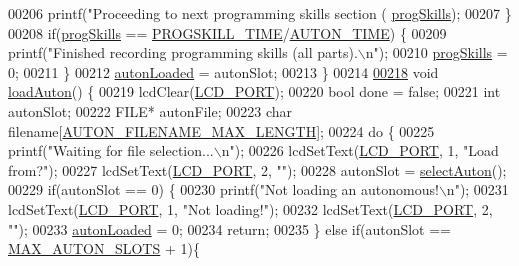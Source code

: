 \begin{DoxyCode}
{{{{{{{{{{{{{{{{{{{{{{{00206         printf(\textcolor{stringliteral}{"Proceeding to next programming skills section (%
      \hyperlink{autonrecorder_8c_aa2eda471576bdbaf33835a71da9bc616}{progSkills});
00207     \}
00208     \textcolor{keywordflow}{if}(\hyperlink{autonrecorder_8c_aa2eda471576bdbaf33835a71da9bc616}{progSkills} == \hyperlink{autonrecorder_8h_a5e27ac66dea6c2da6239f967e72208e2}{PROGSKILL\_TIME}/\hyperlink{autonrecorder_8h_aa19f7c427989a0a67f55958c610d0355}{AUTON\_TIME}) \{
00209         printf(\textcolor{stringliteral}{"Finished recording programming skills (all parts).\(\backslash\)n"});
00210         \hyperlink{autonrecorder_8c_aa2eda471576bdbaf33835a71da9bc616}{progSkills} = 0;
00211     \}
00212     \hyperlink{autonrecorder_8c_a4e72d907ee74449b71b5e20943f4217e}{autonLoaded} = autonSlot;
00213 \}
00214 
\hypertarget{autonrecorder_8c_source.tex_l00218}{}\hyperlink{autonrecorder_8h_af6d130061f44459f9b3c629123e78f6e}{00218} \textcolor{keywordtype}{void} \hyperlink{autonrecorder_8c_af6d130061f44459f9b3c629123e78f6e}{loadAuton}() \{
00219     lcdClear(\hyperlink{lcdmsg_8h_abcf42bd88b3c36193f301ca25b033875}{LCD\_PORT});
00220     \textcolor{keywordtype}{bool} done = \textcolor{keyword}{false};
00221     \textcolor{keywordtype}{int} autonSlot;
00222     FILE* autonFile;
00223     \textcolor{keywordtype}{char} filename[\hyperlink{autonrecorder_8h_a9411d1482daa18dd8221c30db7fc6e4e}{AUTON\_FILENAME\_MAX\_LENGTH}];
00224     \textcolor{keywordflow}{do} \{
00225         printf(\textcolor{stringliteral}{"Waiting for file selection...\(\backslash\)n"});
00226         lcdSetText(\hyperlink{lcdmsg_8h_abcf42bd88b3c36193f301ca25b033875}{LCD\_PORT}, 1, \textcolor{stringliteral}{"Load from?"});
00227         lcdSetText(\hyperlink{lcdmsg_8h_abcf42bd88b3c36193f301ca25b033875}{LCD\_PORT}, 2, \textcolor{stringliteral}{""});
00228         autonSlot = \hyperlink{autonrecorder_8c_a7233586e332461dc25c7cc950a08d429}{selectAuton}();
00229         \textcolor{keywordflow}{if}(autonSlot == 0) \{
00230             printf(\textcolor{stringliteral}{"Not loading an autonomous!\(\backslash\)n"});
00231             lcdSetText(\hyperlink{lcdmsg_8h_abcf42bd88b3c36193f301ca25b033875}{LCD\_PORT}, 1, \textcolor{stringliteral}{"Not loading!"});
00232             lcdSetText(\hyperlink{lcdmsg_8h_abcf42bd88b3c36193f301ca25b033875}{LCD\_PORT},   2, \textcolor{stringliteral}{""});
00233             \hyperlink{autonrecorder_8c_a4e72d907ee74449b71b5e20943f4217e}{autonLoaded} = 0;
00234             \textcolor{keywordflow}{return};
00235         \} \textcolor{keywordflow}{else} \textcolor{keywordflow}{if}(autonSlot == \hyperlink{autonrecorder_8h_a5173a11a545cb4020fdd139552dc15c1}{MAX\_AUTON\_SLOTS} + 1)\{
}}}}}}}}}}}}}}}}}}}}}}}}
\end{DoxyCode}
